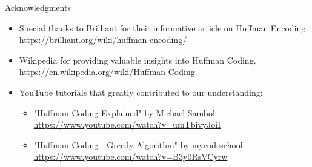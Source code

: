 \documentclass{beamer}
\begin{document}
	
	
	\begin{frame}{Acknowledgments}
		\begin{itemize}
			\item Special thanks to Brilliant for their informative article on Huffman Encoding. \\
			\href{https://brilliant.org/wiki/huffman-encoding/}{https://brilliant.org/wiki/huffman-encoding/}
			
			\item Wikipedia for providing valuable insights into Huffman Coding. \\
			\href{https://en.wikipedia.org/wiki/Huffman_coding}{https://en.wikipedia.org/wiki/Huffman-Coding}
			
			\item YouTube tutorials that greatly contributed to our understanding:
			\begin{itemize}
				\item "Huffman Coding Explained" by Michael Sambol \\
				\href{https://www.youtube.com/watch?v=umTbivyJoiI}{https://www.youtube.com/watch?v=umTbivyJoiI}
				\item "Huffman Coding - Greedy Algorithm" by mycodeschool \\
				\href{https://www.youtube.com/watch?v=B3y0RsVCyrw}{https://www.youtube.com/watch?v=B3y0RsVCyrw}
			\end{itemize}
		\end{itemize}
	\end{frame}
	
	
	
	
\end{document}
